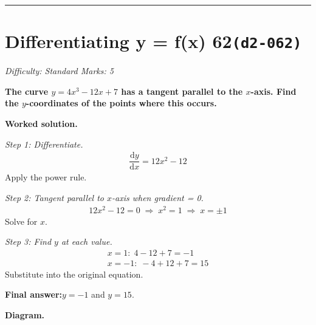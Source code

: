 \documentclass[11pt]{article}
\newcommand{\question}[1]{\par\medskip\noindent\textbf{#1}\par}
\begin{document}
\medskip\hrule

\section*{Differentiating y = f(x) 62\quad\small\texttt{(d2-062)}}
\textit{Difficulty: Standard \quad\textbar\quad Marks: 5}

\question{The curve \( y = 4x^3 - 12x + 7 \) has a tangent parallel to the \( x \)-axis. Find the \( y \)-coordinates of the points where this occurs.}

\textbf{Worked solution.}

\textit{Step 1: Differentiate.}
\[\begin{gathered}
\dfrac{\mathrm{d}y}{\mathrm{d}x} = 12x^2 - 12
\end{gathered}\]
Apply the power rule.

\textit{Step 2: Tangent parallel to \( x \)-axis when gradient = 0.}
\[\begin{gathered}
12x^2 - 12 = 0 \;\Rightarrow\; x^2 = 1 \;\Rightarrow\; x = \pm 1
\end{gathered}\]
Solve for \( x \).

\textit{Step 3: Find \( y \) at each value.}
\[\begin{gathered}
x = 1: \; 4 - 12 + 7 = -1 \\ x = -1: \; -4 + 12 + 7 = 15
\end{gathered}\]
Substitute into the original equation.

\begin{answerbox}
\textbf{Final answer:}\quad \(\displaystyle  y = -1 \) and \(\displaystyle  y = 15 \).
\end{answerbox}
\textbf{Diagram.}
\end{document}
